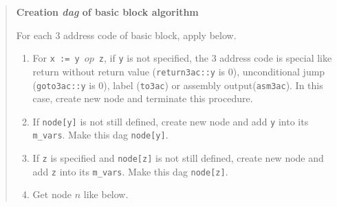 \begin{quote}
{\bf Creation {\em dag} of basic block algorithm}

For each 3 address code of basic block, apply below. 
\begin{enumerate}
\item For {\tt{x := y $op$ z}}, if {\tt{y}} is not specified,
      the 3 address code is special like 
      return without return value
      ({\tt{return3ac::y}} is 0),
      unconditional jump ({\tt{goto3ac::y}} is 0),
      label ({\tt{to3ac}}) or
      assembly output({\tt{asm3ac}}).
      In this case, create new node and terminate this procedure. 

\item If {\tt{node[y]}} is not still defined, 
      create new node and add {\tt{y}} into its {\tt{m\_vars}}.
      Make this dag {\tt{node[y]}}. 

\item If {\tt{z}} is specified and {\tt{node[z]}} is not still defined,
      create new node and add {\tt{z}} into its {\tt{m\_vars}}.
      Make this dag {\tt{node[z]}}.

\item 
\label{optimize_e047}
Get node $n$ like below.


\end{enumerate}
\end{quote}
